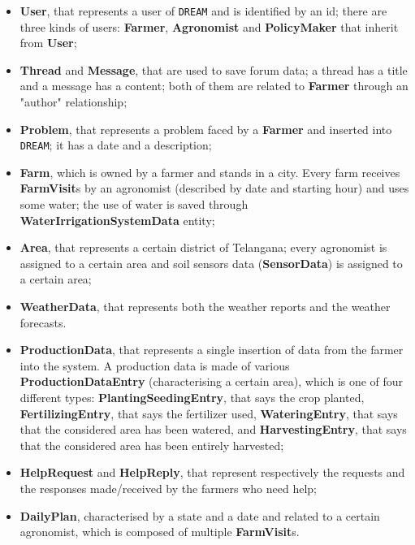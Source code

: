 \documentclass{article}
\begin{document}
\begin{itemize}
    \item \textbf{User}, that represents a user of \verb|DREAM| and is identified by an id; there are three kinds of users: \textbf{Farmer}, \textbf{Agronomist} and \textbf{PolicyMaker} that inherit from \textbf{User};
    \item \textbf{Thread} and \textbf{Message}, that are used to save forum data; a thread has a title and a message has a content; both of them are related to \textbf{Farmer} through an "author" relationship;
    \item \textbf{Problem}, that represents a problem faced by a \textbf{Farmer} and inserted into \verb|DREAM|; it has a date and a description;
    \item \textbf{Farm}, which is owned by a farmer and stands in a city. Every farm receives \textbf{FarmVisit}s by an agronomist (described by date and starting hour) and uses some water; the use of water is saved through \textbf{WaterIrrigationSystemData} entity;
    \item \textbf{Area}, that represents a certain district of Telangana; every agronomist is assigned to a certain area and soil sensors data (\textbf{SensorData}) is assigned to a certain area;
    \item \textbf{WeatherData}, that represents both the weather reports and the weather forecasts. 
    \item \textbf{ProductionData}, that represents a single insertion of data from the farmer into the system. A production data is made of various \textbf{ProductionDataEntry} (characterising a certain area), which is one of four different types: \textbf{PlantingSeedingEntry}, that says the crop planted, \textbf{FertilizingEntry}, that says the fertilizer used, \textbf{WateringEntry}, that says that the considered area has been watered, and \textbf{HarvestingEntry}, that says that the considered area has been entirely harvested;
    \item \textbf{HelpRequest} and \textbf{HelpReply}, that represent respectively the requests and the responses made/received by the farmers who need help;
    \item \textbf{DailyPlan}, characterised by a state and a date and related to a certain agronomist, which is composed of multiple \textbf{FarmVisit}s.
\end{itemize}
\newpage
\end{document}
